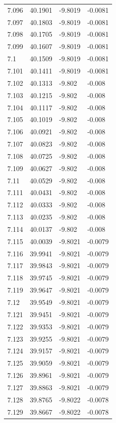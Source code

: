 \begin{tabular}{llll}
7.096 & 40.1901 & -9.8019 & -0.0081 \\
7.097 & 40.1803 & -9.8019 & -0.0081 \\
7.098 & 40.1705 & -9.8019 & -0.0081 \\
7.099 & 40.1607 & -9.8019 & -0.0081 \\
7.1 & 40.1509 & -9.8019 & -0.0081 \\
7.101 & 40.1411 & -9.8019 & -0.0081 \\
7.102 & 40.1313 & -9.802 & -0.008 \\
7.103 & 40.1215 & -9.802 & -0.008 \\
7.104 & 40.1117 & -9.802 & -0.008 \\
7.105 & 40.1019 & -9.802 & -0.008 \\
7.106 & 40.0921 & -9.802 & -0.008 \\
7.107 & 40.0823 & -9.802 & -0.008 \\
7.108 & 40.0725 & -9.802 & -0.008 \\
7.109 & 40.0627 & -9.802 & -0.008 \\
7.11 & 40.0529 & -9.802 & -0.008 \\
7.111 & 40.0431 & -9.802 & -0.008 \\
7.112 & 40.0333 & -9.802 & -0.008 \\
7.113 & 40.0235 & -9.802 & -0.008 \\
7.114 & 40.0137 & -9.802 & -0.008 \\
7.115 & 40.0039 & -9.8021 & -0.0079 \\
7.116 & 39.9941 & -9.8021 & -0.0079 \\
7.117 & 39.9843 & -9.8021 & -0.0079 \\
7.118 & 39.9745 & -9.8021 & -0.0079 \\
7.119 & 39.9647 & -9.8021 & -0.0079 \\
7.12 & 39.9549 & -9.8021 & -0.0079 \\
7.121 & 39.9451 & -9.8021 & -0.0079 \\
7.122 & 39.9353 & -9.8021 & -0.0079 \\
7.123 & 39.9255 & -9.8021 & -0.0079 \\
7.124 & 39.9157 & -9.8021 & -0.0079 \\
7.125 & 39.9059 & -9.8021 & -0.0079 \\
7.126 & 39.8961 & -9.8021 & -0.0079 \\
7.127 & 39.8863 & -9.8021 & -0.0079 \\
7.128 & 39.8765 & -9.8022 & -0.0078 \\
7.129 & 39.8667 & -9.8022 & -0.0078 \\

\end{tabular}
